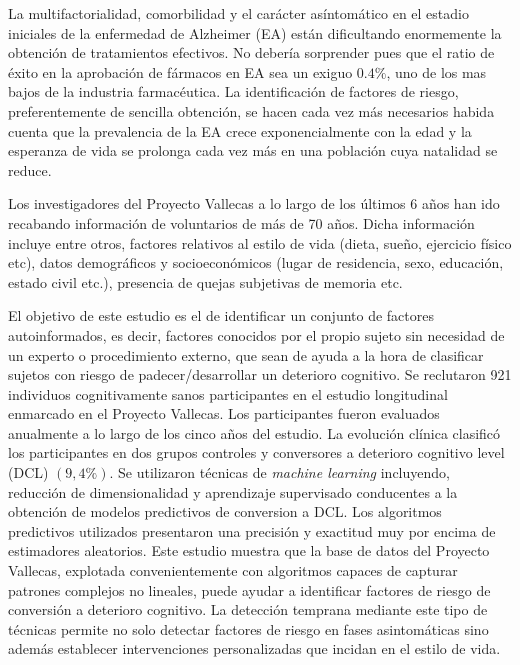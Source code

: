 \documentclass[11pt]{article}
\theoremstyle{definition}
\theoremstyle{remark}
\begin{document}
La multifactorialidad, comorbilidad y el carácter asíntomático en el estadio iniciales de la enfermedad de Alzheimer (EA) están dificultando enormemente la obtención de tratamientos efectivos. No debería sorprender pues que el ratio de éxito en la aprobación de fármacos en EA sea un exiguo $0.4\%$, uno de los mas bajos de la industria farmacéutica. 
La identificación de factores de riesgo, preferentemente de sencilla obtención, se hacen cada vez más necesarios habida cuenta que la prevalencia de la EA crece exponencialmente con la edad y la esperanza de vida se prolonga cada vez más en una población cuya natalidad se reduce.

Los investigadores del Proyecto Vallecas a lo largo de los últimos 6 años han ido recabando información de voluntarios de más de 70 años. Dicha información incluye entre otros, factores relativos al estilo de vida (dieta, sueño, ejercicio físico etc), datos demográficos y socioeconómicos (lugar de residencia, sexo, educación, estado civil etc.), presencia de quejas subjetivas de memoria etc.

El objetivo de este estudio es el de identificar un conjunto de factores autoinformados, es decir, factores conocidos por el propio sujeto sin necesidad de un experto o procedimiento externo, que sean de ayuda a la hora de clasificar sujetos con riesgo de padecer/desarrollar un deterioro cognitivo.
Se reclutaron 921 individuos cognitivamente sanos participantes en el estudio longitudinal enmarcado en el Proyecto Vallecas. Los participantes fueron evaluados anualmente a lo largo de los cinco años del estudio. La evolución clínica clasificó los participantes en dos grupos controles y conversores a deterioro cognitivo level (DCL) $(9,4\%)$. 
Se utilizaron técnicas de \emph{machine learning} incluyendo, reducción de dimensionalidad y aprendizaje supervisado conducentes a la obtención de modelos predictivos de conversion a DCL. Los algoritmos predictivos utilizados presentaron una precisión y exactitud muy por encima de estimadores aleatorios.
Este estudio muestra que la base de datos del Proyecto Vallecas, explotada convenientemente con algoritmos capaces de capturar patrones complejos no lineales, puede ayudar a identificar factores de riesgo de conversión a deterioro cognitivo. La detección temprana mediante este tipo de técnicas permite no solo detectar factores de riesgo en fases asintomáticas sino además establecer intervenciones personalizadas que incidan en el estilo de vida.
\end{document}
